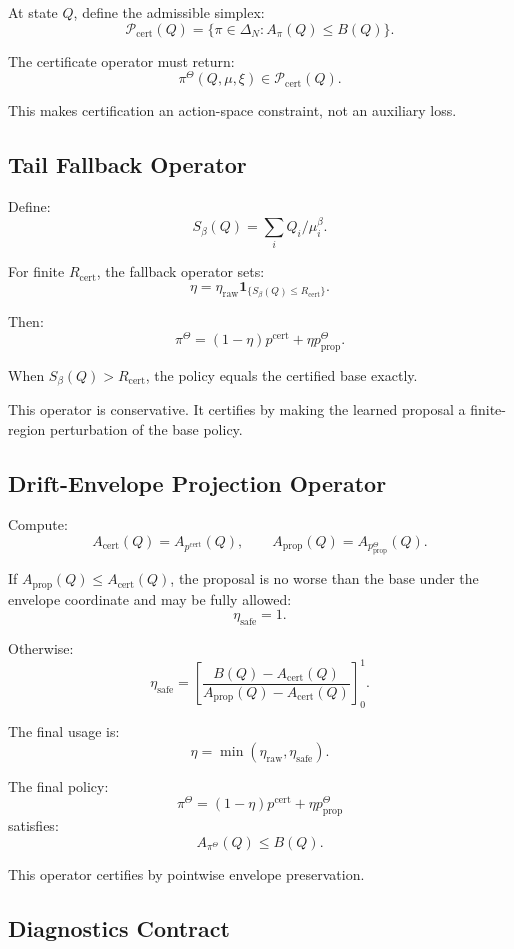 \documentclass[a4paper,11pt]{article}
\theoremstyle{definition}
\begin{document}
At state \(Q\), define the admissible simplex:
\[
\mathcal P_{\mathrm{cert}}(Q)
=
\{\pi\in\Delta_N:A_\pi(Q)\le B(Q)\}.
\]

The certificate operator must return:
\[
\pi^\Theta(Q,\mu,\xi)\in\mathcal P_{\mathrm{cert}}(Q).
\]

This makes certification an action-space constraint, not an auxiliary loss.

\subsection{Tail Fallback Operator}

Define:
\[
S_\beta(Q)=\sum_i Q_i/\mu_i^\beta.
\]

For finite \(R_{\mathrm{cert}}\), the fallback operator sets:
\[
\eta=
\eta_{\mathrm{raw}}\mathbf 1_{\{S_\beta(Q)\le R_{\mathrm{cert}}\}}.
\]

Then:
\[
\pi^\Theta
=
(1-\eta)p^{\mathrm{cert}}+\eta p^\Theta_{\mathrm{prop}}.
\]

When \(S_\beta(Q)>R_{\mathrm{cert}}\), the policy equals the certified base
exactly.

This operator is conservative. It certifies by making the learned proposal a
finite-region perturbation of the base policy.

\subsection{Drift-Envelope Projection Operator}

Compute:
\[
A_{\mathrm{cert}}(Q)=A_{p^{\mathrm{cert}}}(Q),
\qquad
A_{\mathrm{prop}}(Q)=A_{p^\Theta_{\mathrm{prop}}}(Q).
\]

If \(A_{\mathrm{prop}}(Q)\le A_{\mathrm{cert}}(Q)\), the proposal is no worse
than the base under the envelope coordinate and may be fully allowed:
\[
\eta_{\mathrm{safe}}=1.
\]

Otherwise:
\[
\eta_{\mathrm{safe}}
=
\left[
\frac{B(Q)-A_{\mathrm{cert}}(Q)}
{A_{\mathrm{prop}}(Q)-A_{\mathrm{cert}}(Q)}
\right]_0^1.
\]

The final usage is:
\[
\eta=\min(\eta_{\mathrm{raw}},\eta_{\mathrm{safe}}).
\]

The final policy:
\[
\pi^\Theta=(1-\eta)p^{\mathrm{cert}}+\eta p^\Theta_{\mathrm{prop}}
\]
satisfies:
\[
A_{\pi^\Theta}(Q)\le B(Q).
\]

This operator certifies by pointwise envelope preservation.

\subsection{Diagnostics Contract}
\end{document}
